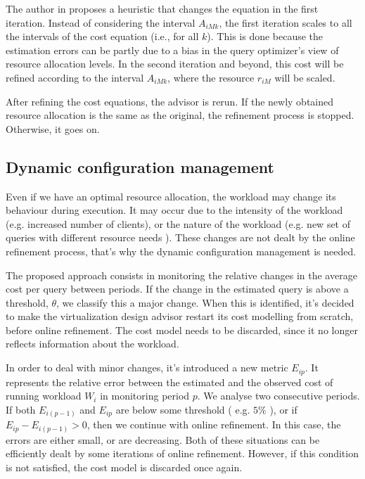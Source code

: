The author in \cite{Soror:2008:AVM:1376616.1376711} proposes a heuristic that changes the equation in the first iteration. Instead of  considering the interval $A_{iMk}$, the first iteration scales to all the intervals of the cost equation (i.e., for all $k$). This is done because the estimation errors can be partly due to a bias in the query optimizer's view of resource allocation levels. In the second iteration and beyond, this cost will be refined according to the interval $A_{iMk}$, where the resource $r_{iM}$ will be scaled.


After refining the cost equations, the advisor is rerun. If the newly obtained resource allocation is the same as the original, the refinement process is stopped. Otherwise, it goes on.

\subsection{Dynamic configuration management}

\label{subsec:dcm}
Even if we have an optimal resource allocation, the workload may change its behaviour during execution. It may occur due to the intensity of the workload (e.g. increased number of clients), or the nature of the workload (e.g. new set of queries with different resource needs ). These changes are not dealt by the online refinement process, that's why the dynamic configuration management is needed. 

The proposed approach consists in monitoring the relative changes in the average cost per query between periods. If the change in the estimated query is above a threshold, $\theta$, we classify this a major change. When this is identified, it's decided to make the virtualization design advisor restart its cost modelling from scratch, before online refinement. The cost model needs to be discarded, since it no longer reflects information about the workload.

In order to deal with minor changes, it's introduced a new metric $E_{ip}$. It represents the relative error between the estimated and the observed cost of running workload $W_{i}$ in monitoring period $p$. We analyse two consecutive periods. If both $E_{i(p-1)}$ and $E_{ip}$ are below some threshold ( e.g. $5\%$ ), or if $E_{ip} - E_{i(p-1)} > 0$, then we continue with online refinement. In this case, the errors are either small, or are decreasing. Both of these situations can be efficiently dealt by some iterations of online refinement. However, if this condition is not satisfied, the cost model is discarded once again. 
